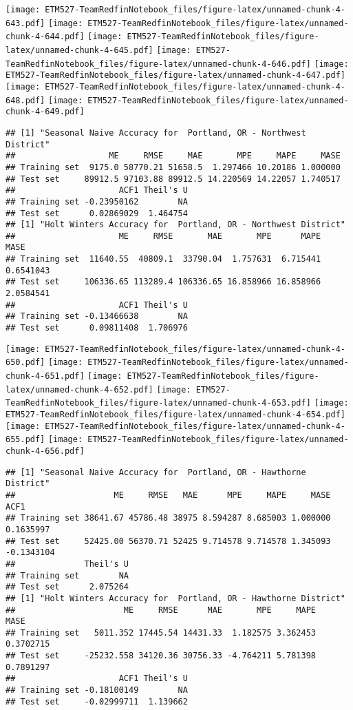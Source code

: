 \documentclass[]{article}
\begin{document}
\texttt{[image: ETM527-TeamRedfinNotebook\_files/figure-latex/unnamed-chunk-4-643.pdf]}
\texttt{[image: ETM527-TeamRedfinNotebook\_files/figure-latex/unnamed-chunk-4-644.pdf]}
\texttt{[image: ETM527-TeamRedfinNotebook\_files/figure-latex/unnamed-chunk-4-645.pdf]}
\texttt{[image: ETM527-TeamRedfinNotebook\_files/figure-latex/unnamed-chunk-4-646.pdf]}
\texttt{[image: ETM527-TeamRedfinNotebook\_files/figure-latex/unnamed-chunk-4-647.pdf]}
\texttt{[image: ETM527-TeamRedfinNotebook\_files/figure-latex/unnamed-chunk-4-648.pdf]}
\texttt{[image: ETM527-TeamRedfinNotebook\_files/figure-latex/unnamed-chunk-4-649.pdf]}

\begin{verbatim}
## [1] "Seasonal Naive Accuracy for  Portland, OR - Northwest District"
##                   ME     RMSE     MAE       MPE     MAPE     MASE
## Training set  9175.0 58770.21 51658.5  1.297466 10.20186 1.000000
## Test set     89912.5 97103.88 89912.5 14.220569 14.22057 1.740517
##                     ACF1 Theil's U
## Training set -0.23950162        NA
## Test set      0.02869029  1.464754
## [1] "Holt Winters Accuracy for  Portland, OR - Northwest District"
##                     ME     RMSE       MAE       MPE      MAPE      MASE
## Training set  11640.55  40809.1  33790.04  1.757631  6.715441 0.6541043
## Test set     106336.65 113289.4 106336.65 16.858966 16.858966 2.0584541
##                     ACF1 Theil's U
## Training set -0.13466638        NA
## Test set      0.09811408  1.706976
\end{verbatim}

\texttt{[image: ETM527-TeamRedfinNotebook\_files/figure-latex/unnamed-chunk-4-650.pdf]}
\texttt{[image: ETM527-TeamRedfinNotebook\_files/figure-latex/unnamed-chunk-4-651.pdf]}
\texttt{[image: ETM527-TeamRedfinNotebook\_files/figure-latex/unnamed-chunk-4-652.pdf]}
\texttt{[image: ETM527-TeamRedfinNotebook\_files/figure-latex/unnamed-chunk-4-653.pdf]}
\texttt{[image: ETM527-TeamRedfinNotebook\_files/figure-latex/unnamed-chunk-4-654.pdf]}
\texttt{[image: ETM527-TeamRedfinNotebook\_files/figure-latex/unnamed-chunk-4-655.pdf]}
\texttt{[image: ETM527-TeamRedfinNotebook\_files/figure-latex/unnamed-chunk-4-656.pdf]}

\begin{verbatim}
## [1] "Seasonal Naive Accuracy for  Portland, OR - Hawthorne District"
##                    ME     RMSE   MAE      MPE     MAPE     MASE       ACF1
## Training set 38641.67 45786.48 38975 8.594287 8.685003 1.000000  0.1635997
## Test set     52425.00 56370.71 52425 9.714578 9.714578 1.345093 -0.1343104
##              Theil's U
## Training set        NA
## Test set      2.075264
## [1] "Holt Winters Accuracy for  Portland, OR - Hawthorne District"
##                      ME     RMSE      MAE       MPE     MAPE      MASE
## Training set   5011.352 17445.54 14431.33  1.182575 3.362453 0.3702715
## Test set     -25232.558 34120.36 30756.33 -4.764211 5.781398 0.7891297
##                     ACF1 Theil's U
## Training set -0.18100149        NA
## Test set     -0.02999711  1.139662
\end{verbatim}
\end{document}
